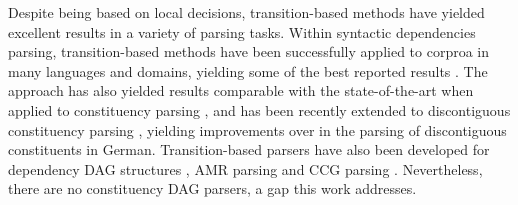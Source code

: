 \documentclass[11pt]{article}
\newcommand{\oa}[1]{\footnote{\color{red} #1}}
\begin{document}
Despite being based on local decisions, transition-based methods have yielded excellent
results in a variety of parsing tasks. Within syntactic dependencies parsing, transition-based methods
have been successfully applied to corproa in many languages and domains, yielding some
of the best reported results \cite{dyer2015transition,ballesteros2015improved}. 
The approach has also yielded results comparable with the state-of-the-art when applied
to constituency parsing \cite{sagae2005classifier,zhu2013fast}, and has been recently extended to
discontiguous constituency parsing \cite{maier2015discontinuous},
yielding improvements over in the parsing of discontiguous constituents in German.
Transition-based parsers have also been developed for dependency DAG structures
\cite{sagae2008shift,tokgoz2015transition}, AMR parsing \cite{wang2015transition} and
CCG parsing \cite{ambati2015}.
Nevertheless, there are no constituency DAG parsers, a gap this work addresses.

%  


\end{document}

